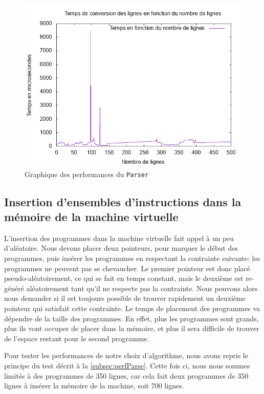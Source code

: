 \documentclass[hidelinks]{report}
\begin{document}
\begin{figure}[H]
    \centering
    \includegraphics[scale=0.8]{images/graphiques/parserPerf.png}
    \caption{Graphique des performances du \texttt{Parser}}
    \label{fig:perfParse}
\end{figure}

\subsection{Insertion d'ensembles d'instructions dans la mémoire de la machine virtuelle}

L'insertion des programmes dans la machine virtuelle fait appel à un peu d'aléatoire. Nous devons placer deux pointeurs, pour marquer le début des programmes, puis insérer les programmes en respectant la contrainte suivante: les programmes ne peuvent pas se chevaucher. Le premier pointeur est donc placé pseudo-aléatoirement, ce qui se fait en temps constant, mais le deuxième est re-généré aléatoirement tant qu'il ne respecte pas la contrainte. Nous pouvons alors nous demander si il est toujours possible de trouver rapidement un deuxième pointeur qui satisfait cette contrainte. Le temps de placement des programmes va dépendre de la taille des programmes. En effet, plus les programmes sont grands, plus ils vont occuper de placer dans la mémoire, et plus il sera difficile de trouver de l'espace restant pour le second programme. 

Pour tester les performances de notre choix d'algorithme, nous avons repris le principe du test décrit à la \autoref{subsec:perfParse}. Cette fois ci, nous nous sommes limités à des programmes de 350 lignes, car cela fait deux programmes de 350 lignes à insérer la mémoire de la machine, soit 700 lignes.
\end{document}
